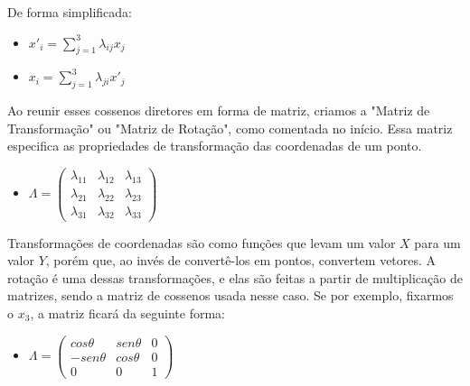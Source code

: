 \documentclass[12pt,a4paper]{article}
\begin{document}
\begin{enumerate}
        De forma simplificada:

        \begin{itemize}
            \item $x'_i = \sum_{j=1}^3 \lambda_{ij} x_j $
            \item $x_i = \sum_{j=1}^3 \lambda_{ji} x'_j $
        \end{itemize}
        
        
        Ao reunir esses cossenos diretores em forma de matriz, criamos a "Matriz de Transformação" ou "Matriz de Rotação", como comentada no início. Essa matriz especifica as propriedades de transformação das coordenadas de um ponto.


        \begin{itemize}
            \item  
            $ 
            \Lambda =
            \begin{pmatrix}
                \lambda_{11} & \lambda_{12} & \lambda_{13}\\ 
                \lambda_{21} & \lambda_{22} & \lambda_{23}\\
                \lambda_{31} & \lambda_{32} & \lambda_{33}
            \end{pmatrix}
            $ 
        \end{itemize}
        
        Transformações de coordenadas são como funções que levam um valor $X$ para um valor $Y$, porém que, ao invés de convertê-los em pontos, convertem vetores. A rotação é uma dessas transformações, e elas são feitas a partir de multiplicação de matrizes, sendo a matriz de cossenos usada nesse caso. Se por exemplo, fixarmos o $x_3$, a matriz ficará da seguinte forma:\\


        \begin{itemize}
            \item  
            $ 
            \Lambda =
            \begin{pmatrix}
                cos\theta & sen\theta & 0\\ 
                -sen\theta & cos\theta & 0\\
                0 & 0 & 1
            \end{pmatrix}
            $ 
        \end{itemize}


\end{enumerate}
\end{document}
